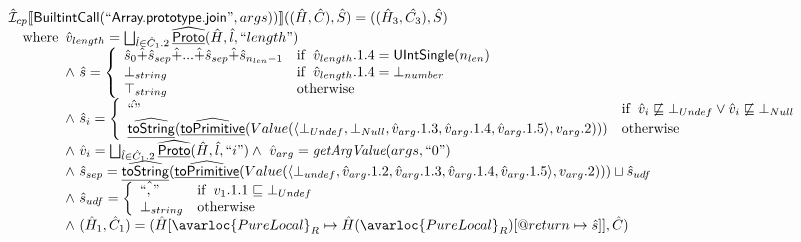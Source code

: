 \[\begin{array}{l}
\aI _{cp}\lbr \SF{BuiltintCall}(``\SF{Array.prototype.join}",args))\rbr((\hat{H},\hat{C}), \hat{S})
  = ((\hat{H}_3, \hat{C_3}), \hat{S})\\
\quad\wherec{
  \hat{v}_{length} = \bigsqcup_{\hat{l} \in \hat{C}_1.2}  \ahf{Proto}(\hat{H}, \hat{l}, ``length")\\
  \land\ \hat{s} = \left\{\begin{array}{ll}
      \hat{s}_0 \hat{+} \hat{s}_{sep} \hat{+} ... \hat{+} \hat{s}_{sep} \hat{+} \hat{s}_{n_{len} -1}& \ifc{\hat{v}_{length}.1.4 = \SF{UIntSingle}(n_{len})}\\
      \bot_{string} & \ifc{\hat{v}_{length}.1.4 = \bot_{number}}\\
      \top_{string} & \owc
    \end{array}\right.\\
  \land\ \hat{s}_i = \left\{\begin{array}{ll}
      \hat{``"} & \ifc{\hat{v}_i \not\sqsubseteq \bot_{Undef} \lor \hat{v}_i \not\sqsubseteq \bot_{Null}}\\
      \ahf{toString}(\ahf{toPrimitive}(Value(\langle\bot_{Undef}, \bot_{Null}, \hat{v}_{arg}.1.3, \hat{v}_{arg}.1.4, \hat{v}_{arg}.1.5\rangle, v_{arg}.2))) & \owc
    \end{array}\right.\\
  \land\ \hat{v}_i =  \bigsqcup_{\hat{l} \in \hat{C}_1.2}  \ahf{Proto}(\hat{H}, \hat{l}, ``i")
  \land\ \hat{v}_{arg} = \hf{getArgValue}(args, ``0")\\
  \land\ \hat{s}_{sep} = \ahf{toString}(\ahf{toPrimitive}(Value(\langle\bot_{undef}, \hat{v}_{arg}.1.2, \hat{v}_{arg}.1.3, \hat{v}_{arg}.1.4, \hat{v}_{arg}.1.5\rangle, v_{arg}.2))) \sqcup \hat{s}_{udf}\\
  \land\ \hat{s}_{udf} = \left\{\begin{array}{ll}
      \hat{``,"} & \ifc{v_1.1.1 \sqsubseteq \bot_{Undef}}\\
      \bot_{string} & \owc
    \end{array}\right.\\
  \land\ (\hat{H}_1, \hat{C}_1) = 
      (\hat{H}[\avarloc{PureLocal}_R \mapsto \hat{H}(\avarloc{PureLocal}_R)[\varprop{return} \mapsto \hat{s}]], \hat{C})\\
  }\\
\\\\

\end{array}
\]

